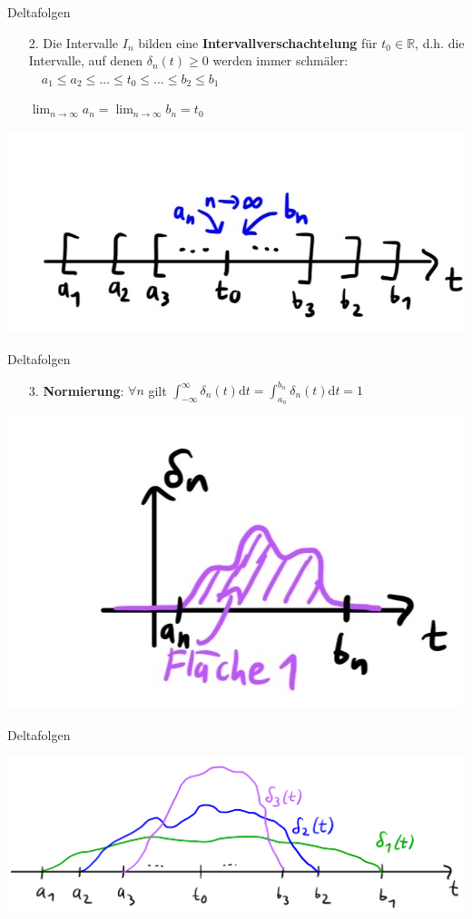 \documentclass[14pt, aspectratio=169, handout]{beamer}
\begin{document}
\begin{frame}{Deltafolgen}
    \begin{itemize}
        \item[2.] Die Intervalle $I_n$ bilden eine \textbf{Intervallverschachtelung} für $t_0 \in \mathbb{R}$, d.h. die Intervalle, auf denen $\delta_n(t) \geq 0$ werden immer schmäler: $ \hspace{12pt} a_1 \leq a_2 \leq \dots \leq t_0 \leq \dots \leq b_2 \leq b_1$
        \item[] 
        \item[] $\displaystyle\lim_{n \to \infty}a_n = \displaystyle\lim_{n \to \infty}b_n = t_0$
    \end{itemize}
    \begin{center}
        \includegraphics[width=0.6\linewidth]{figures/Deltafolge_4.jpg}
    \end{center}
\end{frame}

\begin{frame}{Deltafolgen}
    \begin{itemize}
        \item[3.]  \textbf{Normierung}: $\forall n$ gilt $\displaystyle\int_{-\infty}^\infty \delta_n(t)\text{d}t = \displaystyle\int_{a_n}^{b_n}\delta_n(t)\text{d}t = 1$
    \end{itemize}
    \begin{center}
        \includegraphics[width=0.4\linewidth]{figures/Deltafolge_5.jpg}
    \end{center}
\end{frame}

\begin{frame}{Deltafolgen}
    \begin{center}
        \includegraphics[width=0.9\linewidth]{figures/Deltafolge_2.jpg}
    \end{center}
\end{frame}
\end{document}
